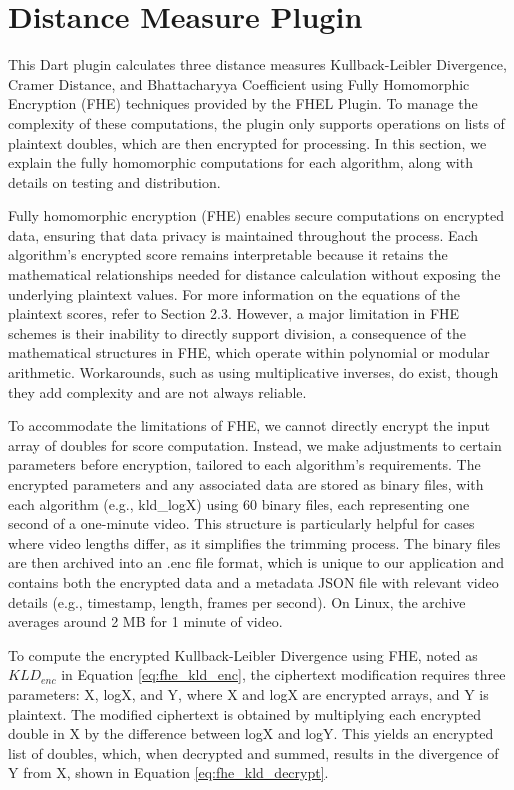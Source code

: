 \section{Distance Measure Plugin}

This Dart plugin calculates three distance measures Kullback-Leibler Divergence, Cramer Distance, and Bhattacharyya Coefficient using Fully Homomorphic Encryption (FHE) techniques provided by the FHEL Plugin. To manage the complexity of these computations, the plugin only supports operations on lists of plaintext doubles, which are then encrypted for processing. In this section, we explain the fully homomorphic computations for each algorithm, along with details on testing and distribution.

Fully homomorphic encryption (FHE) enables secure computations on encrypted data, ensuring that data privacy is maintained throughout the process. Each algorithm’s encrypted score remains interpretable because it retains the mathematical relationships needed for distance calculation without exposing the underlying plaintext values. For more information on the equations of the plaintext scores, refer to Section 2.3. However, a major limitation in FHE schemes is their inability to directly support division, a consequence of the mathematical structures in FHE, which operate within polynomial or modular arithmetic. Workarounds, such as using multiplicative inverses, do exist, though they add complexity and are not always reliable.

To accommodate the limitations of FHE, we cannot directly encrypt the input array of doubles for score computation. Instead, we make adjustments to certain parameters before encryption, tailored to each algorithm’s requirements. The encrypted parameters and any associated data are stored as binary files, with each algorithm (e.g., kld\_logX) using 60 binary files, each representing one second of a one-minute video. This structure is particularly helpful for cases where video lengths differ, as it simplifies the trimming process. The binary files are then archived into an .enc file format, which is unique to our application and contains both the encrypted data and a metadata JSON file with relevant video details (e.g., timestamp, length, frames per second). On Linux, the archive averages around 2 MB for 1 minute of video.

To compute the encrypted Kullback-Leibler Divergence using FHE, noted as $KLD_{enc}$ in Equation \ref{eq:fhe_kld_enc}, the ciphertext modification requires three parameters: X, logX, and Y, where X and logX are encrypted arrays, and Y is plaintext. The modified ciphertext is obtained by multiplying each encrypted double in X by the difference between logX and logY. This yields an encrypted list of doubles, which, when decrypted and summed, results in the divergence of Y from X, shown in Equation \ref{eq:fhe_kld_decrypt}.

